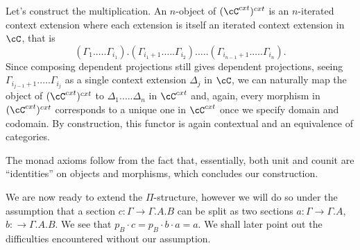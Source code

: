 \begin{construction}
  Let's construct the multiplication. An $n$-object of $(\cC^{cxt})^{cxt}$ is an
  $n$-iterated context extension where each extension is itself an iterated
  context extension in $\cC$, that is
  \[(\Gamma_1.\ldots.\Gamma_{i_1}).(\Gamma_{i_1+1}.\ldots.\Gamma_{i_2}).\ldots.(\Gamma_{i_{n-1}+1}.\ldots.\Gamma_{i_n}).\]
  Since composing dependent projections still gives dependent projections,
  seeing $\Gamma_{i_{j-1}+1}.\ldots.\Gamma_{i_j}$ as a single context extension
  $\Delta_j$ in $\cC$, we can naturally
  map the object of $(\cC^{cxt})^{cxt}$ to $\Delta_1.\ldots.\Delta_n$ in
  $\cC^{cxt}$ and, again, every morphism
  in $(\cC^{cxt})^{cxt}$ corresponds to a unique one in $\cC^{cxt}$ once we
  specify domain and codomain. By construction, this functor is again contextual
  and an equivalence of categories.

  The monad axioms follow from the fact that, essentially, both unit and counit
  are ``identities'' on objects and morphisms, which concludes our construction.
\end{construction}

We are now ready to extend the $\Pi$-structure, however we will do so under the
assumption that a section $c\colon\Gamma\rightarrow\Gamma.A.B$ can be split as
two sections $a\colon\Gamma\rightarrow\Gamma.A$, $b\colon\rightarrow\Gamma.A.B$.
We see that $p_B\cdot c=p_B\cdot b\cdot a=a$. We shall later point out the
difficulties encountered without our assumption.

